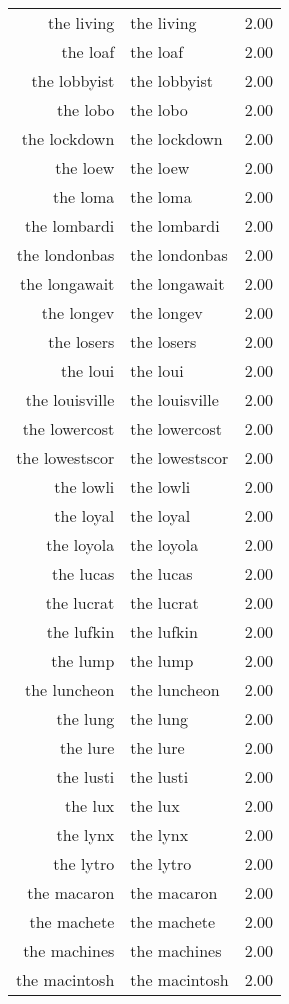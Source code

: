 \begin{table}[ht]
\begin{tabular}{rlr}
  the living & the living & 2.00 \\ 
  the loaf & the loaf & 2.00 \\ 
  the lobbyist & the lobbyist & 2.00 \\ 
  the lobo & the lobo & 2.00 \\ 
  the lockdown & the lockdown & 2.00 \\ 
  the loew & the loew & 2.00 \\ 
  the loma & the loma & 2.00 \\ 
  the lombardi & the lombardi & 2.00 \\ 
  the londonbas & the londonbas & 2.00 \\ 
  the longawait & the longawait & 2.00 \\ 
  the longev & the longev & 2.00 \\ 
  the losers & the losers & 2.00 \\ 
  the loui & the loui & 2.00 \\ 
  the louisville & the louisville & 2.00 \\ 
  the lowercost & the lowercost & 2.00 \\ 
  the lowestscor & the lowestscor & 2.00 \\ 
  the lowli & the lowli & 2.00 \\ 
  the loyal & the loyal & 2.00 \\ 
  the loyola & the loyola & 2.00 \\ 
  the lucas & the lucas & 2.00 \\ 
  the lucrat & the lucrat & 2.00 \\ 
  the lufkin & the lufkin & 2.00 \\ 
  the lump & the lump & 2.00 \\ 
  the luncheon & the luncheon & 2.00 \\ 
  the lung & the lung & 2.00 \\ 
  the lure & the lure & 2.00 \\ 
  the lusti & the lusti & 2.00 \\ 
  the lux & the lux & 2.00 \\ 
  the lynx & the lynx & 2.00 \\ 
  the lytro & the lytro & 2.00 \\ 
  the macaron & the macaron & 2.00 \\ 
  the machete & the machete & 2.00 \\ 
  the machines & the machines & 2.00 \\ 
  the macintosh & the macintosh & 2.00 \\ 

\end{tabular}
\end{table}
